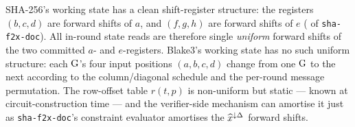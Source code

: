\begin{remark}\label{rem:b3-vs-sha-shift}
SHA-256's working state has a clean shift-register structure: the
registers $(b, c, d)$ are forward shifts of $a$, and $(f, g, h)$ are
forward shifts of $e$ ( of
\texttt{sha-f2x-doc}). All in-round state reads are therefore single
\emph{uniform} forward shifts of the two committed $a$- and
$e$-registers. Blake3's working state has no such uniform structure:
each $\operatorname{G}$'s four input positions $(a, b, c, d)$ change from one
$\operatorname{G}$ to the next according to the column/diagonal schedule and the
per-round message permutation. The row-offset table $r(t, p)$ is
non-uniform but static — known at circuit-construction time — and
the verifier-side mechanism can amortise it just as
\texttt{sha-f2x-doc}'s constraint evaluator amortises the
$\widehat{x}^{\downarrow \Delta}$ forward shifts.
\end{remark}
